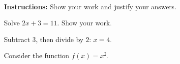 \documentclass{ximera}
\begin{document}
\begin{examcover}
  \examcoverheading{\examtitletext}
  \noindent\examcoursetext\quad\examversiontext\quad\examdatetext\par
  \noindent\examnameprompt\ \examnamefield\par\bigskip
  \noindent\textbf{Instructions:} Show your work and justify your answers.
  \par\bigskip
  \centering
  \standardstable[v][noearned][4]
\end{examcover}

\begin{questions}

\question[ALG1] Solve \(2x+3=11\). Show your work.
\begin{solution}[1.5in]
  Subtract \(3\), then divide by \(2\): \(x=4\).
\end{solution}

\question Consider the function \(f(x)=x^2\).

\end{questions}
\end{document}
